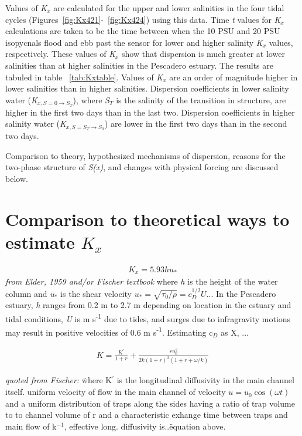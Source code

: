 Values of \emph{K$_x$} are calculated for the upper and lower salinities in the four tidal cycles (Figures~\ref{fig:Kx421}-~\ref{fig:Kx424}) using this data. Time \emph{t} values for \emph{K$_x$} calculations are taken to be the time between when the 10 PSU and 20 PSU isopycnals flood and ebb past the sensor for lower and higher salinity \emph{K$_x$} values, respectively. These values of \emph{K$_x$} show that dispersion is much greater at lower salinities than at higher salinities in the Pescadero estuary. The results are tabuled in table ~\ref{tab:Kxtable}. Values of \emph{K$_x$} are an order of magnitude higher in lower salinities than in higher salinities. Dispersion coefficients in lower salinity water (\emph{K$_{x,S=0 \rightarrow S_T}$}), where \emph{S$_T$} is the salinity of the transition in structure, are higher in the first two days than in the last two. Dispersion coefficients in higher salinity water (\emph{K$_{x,S=S_T \rightarrow S_0}$}) are lower in the first two days than in the second two days. 

Comparison to theory, hypothesized mechanisms of dispersion, reasons for the two-phase structure of \emph{S(x)}, and changes with physical forcing are discussed below. 

\section{Comparison to theoretical ways to estimate $K_x$}

\begin{eqnarray}
K_x = 5.93hu_* \label{eq:Kshear}
\end{eqnarray}
\emph{from Elder, 1959 and/or Fischer textbook} where \emph{h} is the height of the water column and \emph{u$_*$} is the shear velocity $u_*=\sqrt{\tau_0/\rho}=c_D^{1/2}U$... In the Pescadero estuary, \emph{h} ranges from 0.2 m to 2.7 m depending on location in the estuary and tidal conditions, \emph{U} is  m s\textsuperscript{-1} due to tides, and surges due to infragravity motions may result in positive velocities of 0.6 m s\textsuperscript{-1}. Estimating c$_D$ as X, ... 


\begin{eqnarray}
K = \frac{K^{'}}{1+r} + \frac{ru_0^2}{2k(1+r)^2(1+r+\omega / k)} \label{eq:KxOkubo}
\end{eqnarray}

\emph{quoted from Fischer:} \"where K$^{'}$ is the longitudinal diffusivity in the main channel itself. uniform velocity of flow in the main channel of velocity $u = u_0 \cos(\omega t)$ and a uniform distribution of traps along the sides having a ratio of trap volume to to channel volume of r and a characteristic exhange time between traps and main flow of k$^{-1}$, effective long. diffusivity is..\" equation above. 


